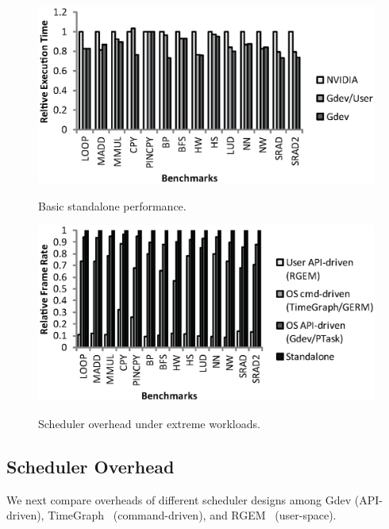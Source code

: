 \begin{figure}[t]
 \begin{center}
  \includegraphics[width=\hsize]{eps/basic_performance.eps}\\
  \vspace{-1.5em}
  \caption{Basic standalone performance.}
  \label{fig:basic_performance}
 \end{center}
 \begin{center}
  \includegraphics[width=\hsize]{eps/scheduler_overhead.eps}\\
  \vspace{-1.5em}
  \caption{Scheduler overhead under extreme workloads.}
  \label{fig:scheduler_overhead}
 \end{center}
  \vspace{-2em}
\end{figure}

\subsection{Scheduler Overhead}

We next compare overheads of different scheduler designs among Gdev
(API-driven), TimeGraph~\cite{Kato_ATC11} (command-driven), and
RGEM~\cite{Kato_RTSS11} (user-space).

